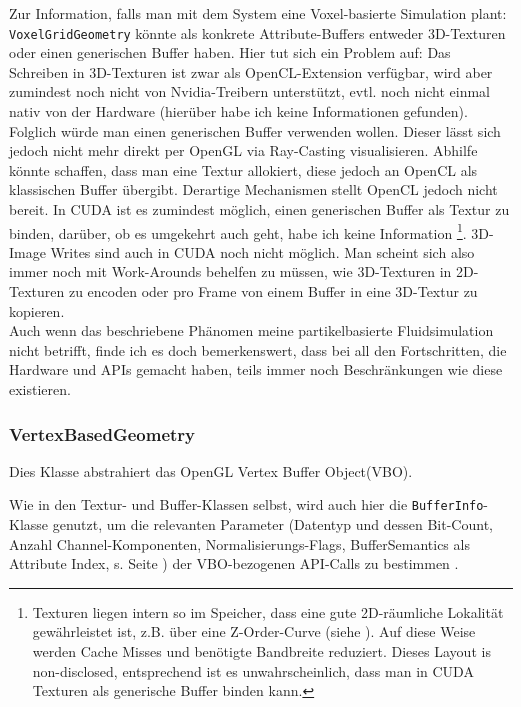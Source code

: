 		Zur Information, falls man mit dem System eine Voxel-basierte Simulation plant:\\
		\lstinline|VoxelGridGeometry|  könnte als konkrete Attribute-Buffers
		entweder 3D-Texturen oder einen generischen Buffer haben. Hier tut sich ein Problem auf:
		Das Schreiben in 3D-Texturen ist zwar als OpenCL-Extension verfügbar, wird aber zumindest noch nicht
		von Nvidia-Treibern unterstützt, evtl. noch nicht einmal nativ von der Hardware (hierüber habe ich keine
		Informationen gefunden).
		Folglich würde man einen generischen Buffer verwenden wollen.
		Dieser lässt sich jedoch nicht mehr direkt per OpenGL via Ray-Casting visualisieren.
		Abhilfe könnte schaffen, dass man eine Textur allokiert, diese jedoch an OpenCL als klassischen Buffer übergibt.
		Derartige Mechanismen stellt OpenCL jedoch nicht bereit. In CUDA ist es zumindest möglich, einen generischen 
		Buffer als Textur zu binden, darüber, ob es umgekehrt auch geht, habe ich keine Information 
		\footnote{Texturen liegen intern so im Speicher, dass eine gute 2D-räumliche Lokalität gewährleistet ist, z.B.
		über eine Z-Order-Curve (siehe \cite{internet:zOrderCurve}). Auf diese Weise werden Cache Misses und 	
		benötigte Bandbreite reduziert. Dieses Layout is non-disclosed, entsprechend ist es unwahrscheinlich,
		dass man in CUDA Texturen als generische Buffer binden kann.}.
		3D-Image Writes sind auch in CUDA noch nicht möglich. Man scheint sich also immer noch
		mit Work-Arounds behelfen zu müssen, wie 3D-Texturen in 2D-Texturen zu encoden oder pro Frame von einem Buffer
		in eine 3D-Textur zu kopieren.\\
		Auch wenn das beschriebene Phänomen meine partikelbasierte Fluidsimulation nicht betrifft, 
		finde ich es doch bemerkenswert, dass bei all den
		Fortschritten, die Hardware und APIs gemacht haben, teils immer noch Beschränkungen wie diese
		existieren.


	\subsubsection{VertexBasedGeometry}
	\label{sec:VertexBasedGeometry}
	
	Dies Klasse abstrahiert das OpenGL Vertex Buffer Object(VBO).
	
	Wie in den Textur- und Buffer-Klassen selbst, wird auch hier die \lstinline|BufferInfo|-Klasse genutzt,
	um die relevanten Parameter (Datentyp und dessen Bit-Count, 
	Anzahl Channel-Komponenten, Normalisierungs-Flags, BufferSemantics als Attribute Index, 
	s. Seite \pageref{item:BufferSemantics}) der VBO-bezogenen API-Calls zu bestimmen .
	
